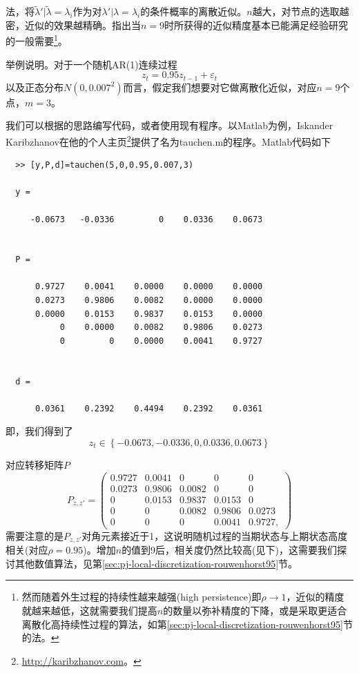 \begin{subappendices}
\cite{Tauchen:1986gi}法，将$\tilde{\lambda}'|\tilde{\lambda} = \lambda_i$作为对$ \lambda'|\lambda = \lambda_i$的条件概率的离散近似。$n$越大，对节点的选取越密，近似的效果越精确。\cite{Tauchen:1986gi}指出当$n=9$时所获得的近似精度基本已能满足经验研究的一般需要\footnote{然而随着外生过程的持续性越来越强(high persistence)即$\rho \rightarrow 1$，近似的精度就越来越低，这就需要我们提高$n$的数量以弥补精度的下降，或是采取更适合离散化高持续性过程的算法，如第\ref{sec:pj-local-discretization-rouwenhorst95}节的\cite{Rouwenhorst:1995tq}法。}。

举例说明。对于一个随机AR(1)连续过程
\begin{equation*}
  z_t = 0.95 z_{t-1} + \varepsilon_t
\end{equation*}
以及正态分布$N(0,0.007^2)$而言，假定我们想要对它做离散化近似，对应$n=9$个点，$m=3$。

我们可以根据\cite{Tauchen:1986gi}的思路编写代码，或者使用现有程序。以Matlab为例，Iskander Karibzhanov在他的个人主页\footnote{\url{http://karibzhanov.com}。}提供了名为tauchen.m的程序。Matlab代码如下
\begin{verbatim}
  >> [y,P,d]=tauchen(5,0,0.95,0.007,3)

  y =

     -0.0673   -0.0336         0    0.0336    0.0673


  P =

      0.9727    0.0041    0.0000    0.0000    0.0000
      0.0273    0.9806    0.0082    0.0000    0.0000
      0.0000    0.0153    0.9837    0.0153    0.0000
           0    0.0000    0.0082    0.9806    0.0273
           0         0    0.0000    0.0041    0.9727


  d =

      0.0361    0.2392    0.4494    0.2392    0.0361
\end{verbatim}

即，我们得到了
\begin{equation*}
  z_t \in \left\{ -0.0673,   -0.0336,         0,    0.0336,    0.0673 \right\}
\end{equation*}

对应转移矩阵$P$
\begin{equation*}
P_{z,z'}=  \begin{pmatrix}
0.9727&    0.0041&    0&    0&    0\\
0.0273&    0.9806&    0.0082&    0&    0\\
0&    0.0153&    0.9837&    0.0153&    0\\
0&    0&    0.0082&    0.9806&    0.0273\\
0&         0&    0&    0.0041&    0.9727,
  \end{pmatrix}
\end{equation*}
需要注意的是$P_{z,z'}$对角元素接近于1，这说明随机过程的当期状态与上期状态高度相关(对应$\rho = 0.95$)。\cite{Tauchen:1986gi}增加$n$的值到9后，相关度仍然比较高(见下)，这需要我们探讨其他数值算法，见第\ref{sec:pj-local-discretization-rouwenhorst95}节。


\end{subappendices}
